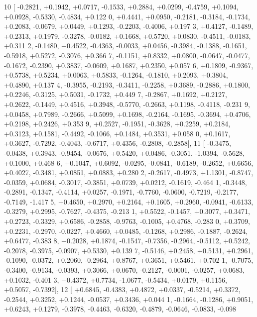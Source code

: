 \begin{DoxyCode}
10 [ -0.2821, +0.1942, +0.0717, -0.1533, +0.2884, +0.0299, -0.4759, +0.1094, +0.0928, -0.5330, -0.4834, +0.122
      0, +0.4441, +0.0950, -0.2181, -0.3184, -0.1734, +0.2083, -0.0679, +0.0449, +0.1293, -0.2203, -0.4006, +0.197
      3, +0.4127, -0.1489, +0.2313, +0.1979, -0.3278, -0.0182, +0.1668, +0.5720, +0.0830, -0.4511, -0.0183, +0.311
      2, -0.1480, +0.4522, -0.4363, -0.0033, +0.0456, -0.3984, -0.1388, -0.1651, -0.5918, +0.5272, -0.3076, +0.366
      7, -0.1151, +0.8332, +0.0800, -0.0647, -0.0477, -0.1672, -0.2390, +0.3837, -0.0609, +0.1687, +0.2350, +0.057
      6, +0.1809, -0.9367, +0.5738, +0.5234, +0.0063, +0.5833, -0.1264, -0.1810, +0.2093, +0.3804, +0.4890, +0.137
      4, -0.3955, -0.2193, -0.3411, -0.2258, +0.3689, -0.2886, +0.1800, +0.2246, -0.3125, +0.5031, -0.1732, +0.449
      7, -0.2867, +0.1692, +0.2127, +0.2622, -0.1449, +0.4516, +0.3948, -0.5770, -0.2663, +0.1198, -0.4118, -0.231
      9, +0.0458, +0.7989, -0.2666, +0.5099, +0.1698, -0.2164, -0.1695, -0.3694, +0.4706, +0.2198, +0.2426, +0.353
      9, +0.2527, -0.1951, -0.3628, +0.2259, +0.2184, +0.3123, +0.1581, -0.4492, -0.1066, +0.1484, +0.3531, +0.058
      0, +0.1617, +0.3627, -0.7292, -0.4043, -0.6717, +0.4356, -0.2808, -0.2858],
11 [ -0.3475, -0.0438, +0.3943, -0.9454, -0.0676, +0.5420, +0.0486, -0.3051, -1.0394, -0.5628, +0.1000, +0.468
      6, +0.1047, +0.6092, -0.0295, -0.0841, -0.6189, -0.2652, +0.6656, +0.4027, -0.3481, +0.0851, +0.0883, +0.280
      2, -0.2617, -0.4973, +1.1301, -0.8747, -0.0359, +0.0684, -0.3017, -0.3851, +0.0739, +0.0212, -0.1619, -0.464
      1, -0.3448, -0.2891, -0.1347, -0.4114, +0.0257, -0.1971, -0.7760, -0.0600, -0.7219, -0.2177, -0.7149, -1.417
      5, +0.4650, +0.2970, +0.2164, +0.1605, +0.2960, -0.0941, -0.6133, -0.3279, +0.2995, -0.7627, -0.4375, -0.213
      1, +0.5522, -0.1457, +0.3077, +0.3471, +0.2723, -0.3329, +0.6586, -0.2858, -0.9763, -0.1005, +0.4768, -0.283
      0, +0.3709, +0.2231, -0.2970, -0.0227, +0.4660, +0.0485, -0.1268, +0.2986, -0.1887, -0.2624, +0.6477, -0.383
      8, +0.2028, +0.1874, -0.1547, -0.7356, -0.2964, -0.5112, +0.5242, -0.2078, -0.3975, -0.0907, +0.5330, +0.139
      7, -0.5146, +0.2458, +0.5131, +0.2961, -0.1090, -0.0372, +0.2060, -0.2964, +0.8767, +0.3651, +0.5461, +0.702
      1, -0.7075, -0.3400, -0.9134, -0.0393, +0.3066, +0.0670, -0.2127, -0.0001, -0.0257, +0.0683, +0.1032, -0.401
      3, +0.4372, +0.7734, -1.0677, -0.5434, +0.0179, +0.1156, +0.5057, -0.7392],
12 [ +0.6845, -0.4383, +0.4872, +0.0337, -0.5214, +0.3372, -0.2544, +0.3252, +0.1244, -0.0537, +0.3436, +0.044
      1, -0.1664, -0.1286, +0.9051, +0.6243, +0.1279, -0.3978, -0.4463, -0.6320, -0.4879, -0.0646, -0.0833, -0.098

\end{DoxyCode}
